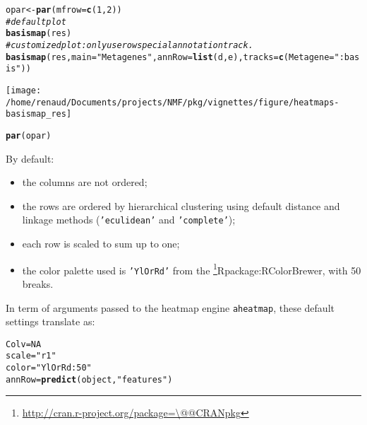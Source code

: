 \documentclass[a4paper]{article}\usepackage[]{graphicx}\usepackage[]{color}
\makeatletter
\def\maxwidth{ %
  \ifdim\Gin@nat@width>\linewidth
    \linewidth
  \else
    \Gin@nat@width
  \fi
}
\newcommand{\hlnum}[1]{\textcolor[rgb]{0.686,0.059,0.569}{#1}}%
\newcommand{\hlstr}[1]{\textcolor[rgb]{0.192,0.494,0.8}{#1}}%
\newcommand{\hlcom}[1]{\textcolor[rgb]{0.678,0.584,0.686}{\textit{#1}}}%
\newcommand{\hlstd}[1]{\textcolor[rgb]{0.345,0.345,0.345}{#1}}%
\newcommand{\hlkwb}[1]{\textcolor[rgb]{0.69,0.353,0.396}{#1}}%
\newcommand{\hlkwc}[1]{\textcolor[rgb]{0.333,0.667,0.333}{#1}}%
\newcommand{\hlkwd}[1]{\textcolor[rgb]{0.737,0.353,0.396}{\textbf{#1}}}%
\newenvironment{kframe}{%
 \def\at@end@of@kframe{}%
 \ifinner\ifhmode%
  \def\at@end@of@kframe{\end{minipage}}%
  \begin{minipage}{\columnwidth}%
 \fi\fi%
 \def\FrameCommand##1{\hskip\@totalleftmargin \hskip-\fboxsep
 \colorbox{shadecolor}{##1}\hskip-\fboxsep
     \hskip-\linewidth \hskip-\@totalleftmargin \hskip\columnwidth}%
 \MakeFramed {\advance\hsize-\width
   \@totalleftmargin\z@ \linewidth\hsize
   \@setminipage}}%
 {\par\unskip\endMakeFramed%
 \at@end@of@kframe}
\newenvironment{knitrout}{}{} %
\let\code=\texttt
\newcommand{\pkgname}[1]{\textit{#1}\xspace}
\newcommand{\CRANurl}[1]{\url{http://cran.r-project.org/package=#1}}
\def\CRANpkg{\@ifstar\@CRANpkg\@@CRANpkg}
\def\@CRANpkg#1{\href{http://cran.r-project.org/package=#1}{\pkgname{#1}}\footnote{\CRANurl{#1}}}
\def\@@CRANpkg#1{\href{http://cran.r-project.org/package=#1}{\pkgname{#1}} package\footnote{\CRANurl{#1}}}
\def\citeCRANpkg{\@ifstar\@citeCRANpkg\@@citeCRANpkg}
\def\@citeCRANpkg#1{\CRANpkg{#1}\cite*{Rpackage:#1}}
\def\@@citeCRANpkg#1{\CRANpkg{#1}~\cite{Rpackage:#1}}
\renewcommand{\cite}[1]{\parencite{#1}}
\makeatother
\begin{document}
\begin{knitrout}
\color{fgcolor}\begin{kframe}
\begin{alltt}
\hlstd{opar} \hlkwb{<-} \hlkwd{par}\hlstd{(}\hlkwc{mfrow} \hlstd{=} \hlkwd{c}\hlstd{(}\hlnum{1}\hlstd{,} \hlnum{2}\hlstd{))}
\hlcom{# default plot}
\hlkwd{basismap}\hlstd{(res)}
\hlcom{# customized plot: only use row special annotation track.}
\hlkwd{basismap}\hlstd{(res,} \hlkwc{main} \hlstd{=} \hlstr{"Metagenes"}\hlstd{,} \hlkwc{annRow} \hlstd{=} \hlkwd{list}\hlstd{(d, e),} \hlkwc{tracks} \hlstd{=} \hlkwd{c}\hlstd{(}\hlkwc{Metagene} \hlstd{=} \hlstr{":basis"}\hlstd{))}
\end{alltt}
\end{kframe}
\texttt{[image: /home/renaud/Documents/projects/NMF/pkg/vignettes/figure/heatmaps-basismap\_res]} 
\begin{kframe}\begin{alltt}
\hlkwd{par}\hlstd{(opar)}
\end{alltt}
\end{kframe}
\end{knitrout}


By default:
\begin{itemize}
\item the columns are not ordered;
\item the rows are ordered by hierarchical clustering using default distance and 
linkage methods (\code{'eculidean'} and \code{'complete'});
\item each row is scaled to sum up to one;
\item the color palette used is \code{'YlOrRd'} from the
\citeCRANpkg{RColorBrewer}, with 50 breaks.
\end{itemize}

In term of arguments passed to the heatmap engine \code{aheatmap}, these default 
settings translate as:

\begin{knitrout}
\color{fgcolor}\begin{kframe}
\begin{alltt}
\hlstd{Colv} \hlkwb{=} \hlnum{NA}
\hlstd{scale} \hlkwb{=} \hlstr{"r1"}
\hlstd{color} \hlkwb{=} \hlstr{"YlOrRd:50"}
\hlstd{annRow} \hlkwb{=} \hlkwd{predict}\hlstd{(object,} \hlstr{"features"}\hlstd{)}
\end{alltt}
\end{kframe}
\end{knitrout}
\end{document}
